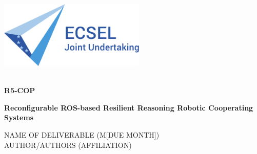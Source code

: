 

\thispagestyle{empty}

%
\label{sec:title}
\vspace{-7ex}

\includegraphics[height=3.2cm]{pics/ecsel-logo}\\[1cm]

\noindent\makebox[\textwidth]{\rule{\textwidth}{2pt}}

{\flushright
~\\[0cm]
	{\bf R5-COP\\[1cm]}

	{\bf Reconfigurable ROS-based Resilient Reasoning Robotic Cooperating Systems\\[2.0cm]}

  { NAME OF DELIVERABLE (M[DUE MONTH])\\[1cm]}
	{AUTHOR/AUTHORS (AFFILIATION) \\}
}

\vfill

